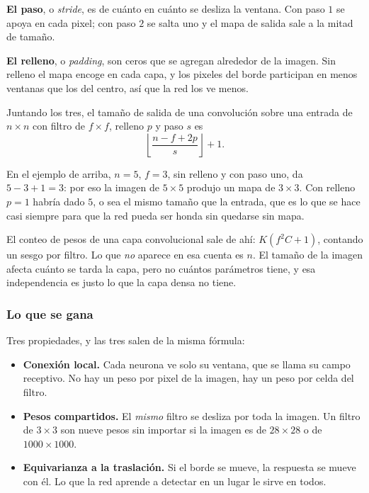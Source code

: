 \documentclass[11pt,letterpaper]{article}
\begin{document}
\textbf{El paso}, o \emph{stride}, es de cuánto en cuánto se desliza
la ventana. Con paso $1$ se apoya en cada pixel; con paso $2$ se salta
uno y el mapa de salida sale a la mitad de tamaño.

\textbf{El relleno}, o \emph{padding}, son ceros que se agregan
alrededor de la imagen. Sin relleno el mapa encoge en cada capa, y los
pixeles del borde participan en menos ventanas que los del centro, así
que la red los ve menos.

Juntando los tres, el tamaño de salida de una convolución sobre una
entrada de $n \times n$ con filtro de $f \times f$, relleno $p$ y paso
$s$ es
\[
    \left\lfloor \frac{n - f + 2p}{s} \right\rfloor + 1 .
\]

En el ejemplo de arriba, $n = 5$, $f = 3$, sin relleno y con paso
uno, da $5 - 3 + 1 = 3$: por eso la imagen de $5 \times 5$ produjo un
mapa de $3 \times 3$. Con relleno $p = 1$ habría dado $5$, o sea el
mismo tamaño que la entrada, que es lo que se hace casi siempre para
que la red pueda ser honda sin quedarse sin mapa.

\begin{idea}
  El conteo de pesos de una capa convolucional sale de ahí:
  $K(f^2 C + 1)$, contando un sesgo por filtro. Lo que \emph{no}
  aparece en esa cuenta es $n$. El tamaño de la imagen afecta cuánto
  se tarda la capa, pero no cuántos parámetros tiene, y esa
  independencia es justo lo que la capa densa no tiene.
\end{idea}

\subsubsection*{Lo que se gana}

Tres propiedades, y las tres salen de la misma fórmula:

\begin{itemize}[itemsep=0.3em]
  \item \textbf{Conexión local.} Cada neurona ve solo su ventana, que
        se llama su campo receptivo. No hay un peso por pixel de la
        imagen, hay un peso por celda del filtro.
  \item \textbf{Pesos compartidos.} El \emph{mismo} filtro se desliza
        por toda la imagen. Un filtro de $3 \times 3$ son nueve pesos
        sin importar si la imagen es de $28 \times 28$ o de
        $1000 \times 1000$.
  \item \textbf{Equivarianza a la traslación.} Si el borde se mueve,
        la respuesta se mueve con él. Lo que la red aprende a detectar
        en un lugar le sirve en todos.
\end{itemize}
\end{document}
